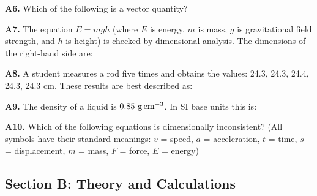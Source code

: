 \begin{exercisebox}[1]
\textbf{A6.} Which of the following is a vector quantity?


\vspace{0.4cm}

\textbf{A7.} The equation $E = mgh$ (where $E$ is energy,
$m$ is mass, $g$ is gravitational field strength, and $h$
is height) is checked by dimensional analysis.
The dimensions of the right-hand side are:


\vspace{0.4cm}

\textbf{A8.} A student measures a rod five times and
obtains the values: 24.3, 24.3, 24.4, 24.3, 24.3 cm.
These results are best described as:


\vspace{0.4cm}

\textbf{A9.} The density of a liquid is
$0.85\ \text{g\,cm}^{-3}$. In SI base units this is:


\vspace{0.4cm}

\textbf{A10.} Which of the following equations is
dimensionally inconsistent? (All symbols have their
standard meanings: $v$ = speed, $a$ = acceleration,
$t$ = time, $s$ = displacement, $m$ = mass,
$F$ = force, $E$ = energy)


\vspace{0.6cm}

\subsection*{Section B: Theory and Calculations}


\end{exercisebox}
